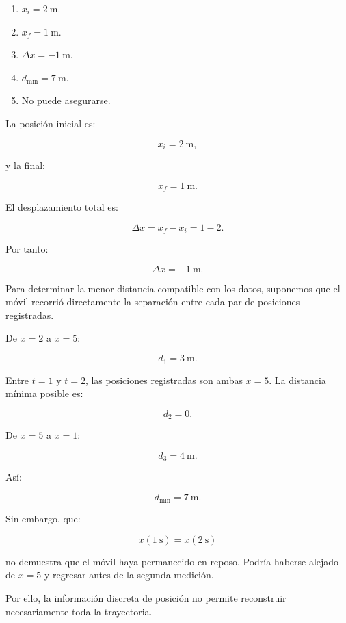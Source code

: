 \begin{respuesta}
\begin{enumerate}[label=\alph*)]
    \item \(x_i=\SI{2}{\meter}\).
    \item \(x_f=\SI{1}{\meter}\).
    \item \(\Delta x=-\SI{1}{\meter}\).
    \item \(d_{\min}=\SI{7}{\meter}\).
    \item No puede asegurarse.
\end{enumerate}
\end{respuesta}

\begin{explicacion}
La posición inicial es:

\[ x_i=\SI{2}{\meter}, \]

y la final:

\[ x_f=\SI{1}{\meter}. \]

El desplazamiento total es:

\[
\Delta x
=
x_f-x_i
=
1-2.
\]

Por tanto:

\[ \boxed{\Delta x=-\SI{1}{\meter}}. \]

Para determinar la menor distancia compatible con los datos, suponemos que el móvil recorrió directamente la separación entre cada par de posiciones registradas.

De \(x=2\) a \(x=5\):

\[ d_1=\SI{3}{\meter}. \]

Entre \(t=1\) y \(t=2\), las posiciones registradas son ambas \(x=5\). La distancia mínima posible es:

\[ d_2=0. \]

De \(x=5\) a \(x=1\):

\[ d_3=\SI{4}{\meter}. \]

Así:

\[ \boxed{d_{\min}=\SI{7}{\meter}}. \]

Sin embargo, que:

\[ x(\SI{1}{\second})=x(\SI{2}{\second}) \]

no demuestra que el móvil haya permanecido en reposo. Podría haberse alejado de \(x=5\) y regresar antes de la segunda medición.

Por ello, la información discreta de posición no permite reconstruir necesariamente toda la trayectoria.
\end{explicacion}


